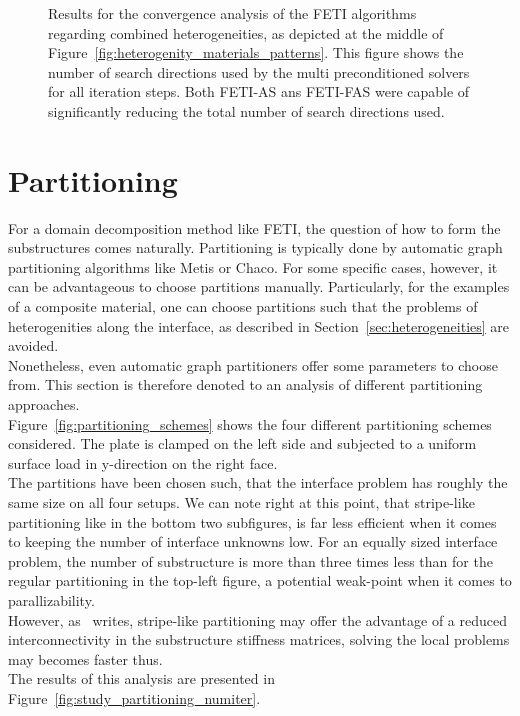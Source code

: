 \begin{figure}
  \begin{center}
    
    \caption[Study of combined heterogeneities: \# search directions]{Results for the convergence analysis of the FETI algorithms regarding combined heterogeneities, as depicted at the middle of Figure~\ref{fig:heterogenity_materials_patterns}. This figure shows the number of search directions used by the multi preconditioned solvers for all iteration steps. Both FETI-AS ans FETI-FAS were capable of significantly reducing the total number of search directions used.}
    \label{heterogeneity_combined_numsdir}
  \end{center}
\end{figure}





\section{Partitioning}
For a domain decomposition method like FETI, the question of how to form the substructures comes naturally. Partitioning is typically done by automatic graph partitioning algorithms like Metis or Chaco. For some specific cases, however, it can be advantageous to choose partitions manually. Particularly, for the examples of a composite material, one can choose partitions such that the problems of heterogenities along the interface, as described in Section~\ref{sec:heterogeneities} are avoided.\\
Nonetheless, even automatic graph partitioners offer some parameters to choose from. This section is therefore denoted to an analysis of different partitioning approaches.
\\
Figure~\ref{fig:partitioning_schemes} shows the four different partitioning schemes considered. The plate is clamped on the left side and subjected to a uniform surface load in y-direction on the right face.
\\
The partitions have been chosen such, that the interface problem has roughly the same size on all four setups. We can note right at this point, that stripe-like partitioning like in the bottom two subfigures, is far less efficient when it comes to keeping the number of interface unknowns low. For an equally sized interface problem, the number of substructure is more than three times less than for the regular partitioning in the top-left figure, a potential weak-point when it comes to parallizability.\\
However, as~\cite{Farhat1991} writes, stripe-like partitioning may offer the advantage of a reduced interconnectivity in the substructure stiffness matrices, solving the local problems may becomes faster thus.
\\
The results of this analysis are presented in Figure~\ref{fig:study_partitioning_numiter}.



